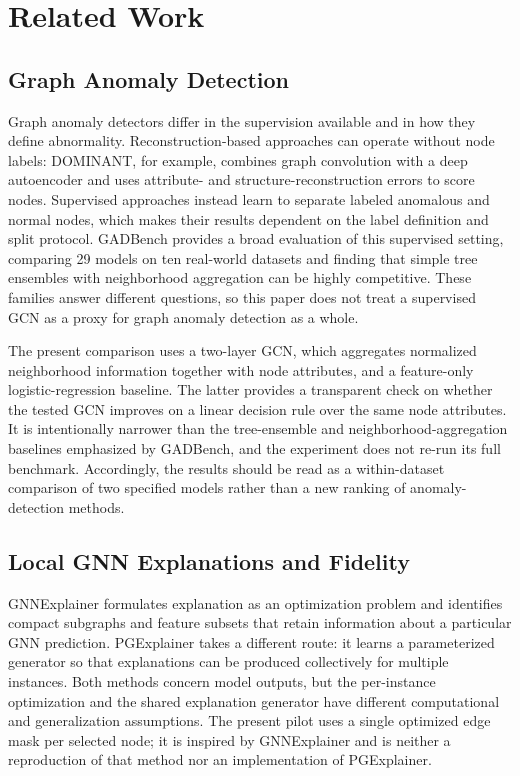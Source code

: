 \documentclass[11pt,a4paper]{article}
\begin{document}
\section{Related Work}
\subsection{Graph Anomaly Detection}
Graph anomaly detectors differ in the supervision available and in how they define abnormality. Reconstruction-based approaches can operate without node labels: DOMINANT, for example, combines graph convolution with a deep autoencoder and uses attribute- and structure-reconstruction errors to score nodes\cite{ding2019dominant}. Supervised approaches instead learn to separate labeled anomalous and normal nodes, which makes their results dependent on the label definition and split protocol. GADBench provides a broad evaluation of this supervised setting, comparing 29 models on ten real-world datasets and finding that simple tree ensembles with neighborhood aggregation can be highly competitive\cite{tang2023gadbench}. These families answer different questions, so this paper does not treat a supervised GCN as a proxy for graph anomaly detection as a whole.

The present comparison uses a two-layer GCN, which aggregates normalized neighborhood information together with node attributes\cite{kipf2017gcn}, and a feature-only logistic-regression baseline. The latter provides a transparent check on whether the tested GCN improves on a linear decision rule over the same node attributes. It is intentionally narrower than the tree-ensemble and neighborhood-aggregation baselines emphasized by GADBench, and the experiment does not re-run its full benchmark. Accordingly, the results should be read as a within-dataset comparison of two specified models rather than a new ranking of anomaly-detection methods.

\subsection{Local GNN Explanations and Fidelity}
GNNExplainer formulates explanation as an optimization problem and identifies compact subgraphs and feature subsets that retain information about a particular GNN prediction\cite{ying2019gnnexplainer}. PGExplainer takes a different route: it learns a parameterized generator so that explanations can be produced collectively for multiple instances\cite{luo2020pgexplainer}. Both methods concern model outputs, but the per-instance optimization and the shared explanation generator have different computational and generalization assumptions. The present pilot uses a single optimized edge mask per selected node; it is inspired by GNNExplainer and is neither a reproduction of that method nor an implementation of PGExplainer.
\end{document}
